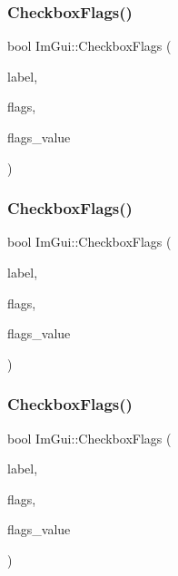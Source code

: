 \mbox{\label{namespaceImGui_aeca400dcf5a82c312b3e669d2fe6e88d}} 
\subsubsection{\texorpdfstring{Checkbox\+Flags()}{CheckboxFlags()}\hspace{0.1cm}{\footnotesize\ttfamily [2/4]}}
{\footnotesize\ttfamily bool Im\+Gui\+::\+Checkbox\+Flags (\begin{DoxyParamCaption}\item[{const char $\ast$}]{label,  }\item[{unsigned int $\ast$}]{flags,  }\item[{unsigned int}]{flags\+\_\+value }\end{DoxyParamCaption})}

\mbox{\label{namespaceImGui_a120a7714cd7e6e8f51aab7c2d56370bb}} 
\subsubsection{\texorpdfstring{Checkbox\+Flags()}{CheckboxFlags()}\hspace{0.1cm}{\footnotesize\ttfamily [3/4]}}
{\footnotesize\ttfamily bool Im\+Gui\+::\+Checkbox\+Flags (\begin{DoxyParamCaption}\item[{const char $\ast$}]{label,  }\item[{Im\+S64 $\ast$}]{flags,  }\item[{Im\+S64}]{flags\+\_\+value }\end{DoxyParamCaption})}

\mbox{\label{namespaceImGui_a9e717a280425b2507c933d2ae2be0a16}} 
\subsubsection{\texorpdfstring{Checkbox\+Flags()}{CheckboxFlags()}\hspace{0.1cm}{\footnotesize\ttfamily [4/4]}}
{\footnotesize\ttfamily bool Im\+Gui\+::\+Checkbox\+Flags (\begin{DoxyParamCaption}\item[{const char $\ast$}]{label,  }\item[{Im\+U64 $\ast$}]{flags,  }\item[{Im\+U64}]{flags\+\_\+value }\end{DoxyParamCaption})}

